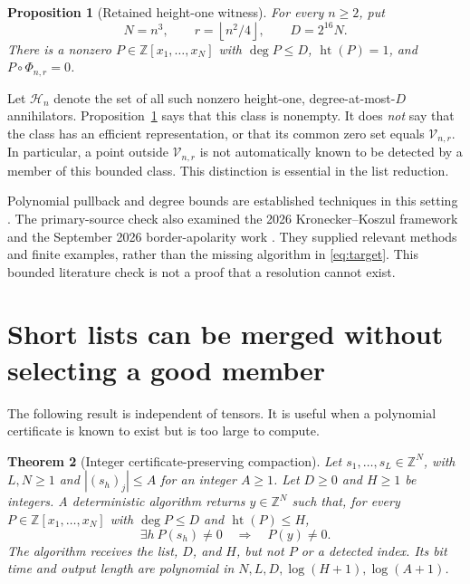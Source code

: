 \documentclass[11pt]{article}
\newtheorem{theorem}{Theorem}[section]
\newtheorem{proposition}[theorem]{Proposition}
\theoremstyle{definition}
\theoremstyle{remark}
\newcommand{\Z}{\mathbb Z}
\newcommand{\height}{\operatorname{ht}}
\newcommand{\Var}{\mathcal V}
\newcommand{\Witness}{\mathcal H}
\newcommand{\floor}[1]{\left\lfloor #1\right\rfloor}
\begin{document}
\begin{proposition}[Retained height-one witness]\label{prop:height}
For every $n\ge2$, put
\begin{equation}\label{eq:retained}
 N=n^3,\qquad r=\floor{n^2/4},\qquad D=2^{16}N.
\end{equation}
There is a nonzero $P\in\Z[x_1,\ldots,x_N]$ with $\deg P\le D$, $\height(P)=1$, and $P\circ\Phi_{n,r}=0$.
\end{proposition}

Let $\Witness_n$ denote the set of all such nonzero height-one, degree-at-most-$D$ annihilators. Proposition~\ref{prop:height} says that this class is nonempty. It does \emph{not} say that the class has an efficient representation, or that its common zero set equals $\Var_{n,r}$. In particular, a point outside $\Var_{n,r}$ is not automatically known to be detected by a member of this bounded class. This distinction is essential in the list reduction.

Polynomial pullback and degree bounds are established techniques in this setting \cite{kumarvolk}. The primary-source check also examined the 2026 Kronecker--Koszul framework \cite{dm} and the September 2026 border-apolarity work \cite{mandziuk}. They supplied relevant methods and finite examples, rather than the missing algorithm in \eqref{eq:target}. This bounded literature check is not a proof that a resolution cannot exist.

\section{Short lists can be merged without selecting a good member}\label{sec:crt}

The following result is independent of tensors. It is useful when a polynomial certificate is known to exist but is too large to compute.

\begin{theorem}[Integer certificate-preserving compaction]\label{thm:crt}
Let $s_1,\ldots,s_L\in\Z^N$, with $L,N\ge1$ and $|(s_h)_j|\le A$ for an integer $A\ge1$. Let $D\ge0$ and $H\ge1$ be integers. A deterministic algorithm returns $y\in\Z^N$ such that, for every $P\in\Z[x_1,\ldots,x_N]$ with $\deg P\le D$ and $\height(P)\le H$,
\begin{equation}\label{eq:preserve}
 \exists h\ P(s_h)\ne0\quad\Longrightarrow\quad P(y)\ne0.
\end{equation}
The algorithm receives the list, $D$, and $H$, but not $P$ or a detected index. Its bit time and output length are polynomial in $N,L,D,\log(H+1),\log(A+1)$.
\end{theorem}
\end{document}
